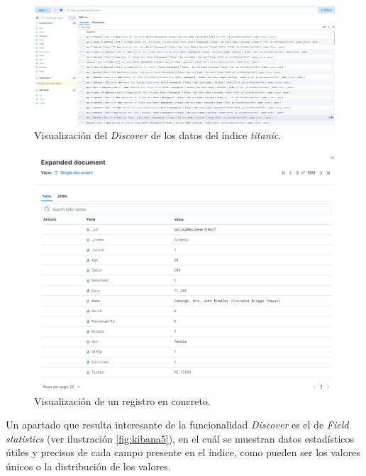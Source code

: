 \begin{figure}
    \centering
    \includegraphics[width=1\linewidth]{img/kibana4.png}
    \caption{Visualización del \textit{Discover} de los datos del índice \textit{titanic}.}
    \label{fig:kibana4}
\end{figure}

\begin{figure}
    \centering
    \includegraphics[width=1\linewidth]{img/kibana6.png}
    \caption{Visualización de un registro en concreto.}
    \label{fig:kibana6}
\end{figure}

Un apartado que resulta interesante de la funcionalidad \textit{Discover} es el de \textit{Field statistics} (ver ilustración  \ref{fig:kibana5}), en el cuál se muestran datos estadísticos útiles y precisos de cada campo presente en el índice, como pueden ser los valores únicos o la distribución de los valores.

